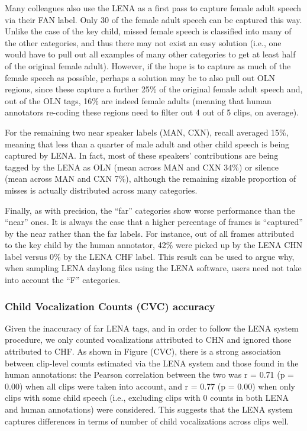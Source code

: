 \documentclass[english,floatsintext,man]{apa6}
\begin{document}
Many colleagues also use the LENA as a first pass to capture female
adult speech via their FAN label. Only 30 of the female adult speech can
be captured this way. Unlike the case of the key child, missed female
speech is classified into many of the other categories, and thus there
may not exist an easy solution (i.e., one would have to pull out all
examples of many other categories to get at least half of the original
female adult). However, if the hope is to capture as much of the female
speech as possible, perhaps a solution may be to also pull out OLN
regions, since these capture a further 25\% of the original female adult
speech and, out of the OLN tags, 16\% are indeed female adults (meaning
that human annotators re-coding these regions need to filter out 4 out
of 5 clips, on average).

For the remaining two near speaker labels (MAN, CXN), recall averaged
15\%, meaning that less than a quarter of male adult and other child
speech is being captured by LENA. In fact, most of these speakers'
contributions are being tagged by the LENA as OLN (mean across MAN and
CXN 34\%) or silence (mean across MAN and CXN 7\%), although the
remaining sizable proportion of misses is actually distributed across
many categories.

Finally, as with precision, the \enquote{far} categories show worse
performance than the \enquote{near} ones. It is always the case that a
higher percentage of frames is \enquote{captured} by the near rather
than the far labels. For instance, out of all frames attributed to the
key child by the human annotator, 42\% were picked up by the LENA CHN
label versus 0\% by the LENA CHF label. This result can be used to argue
why, when sampling LENA daylong files using the LENA software, users
need not take into account the \enquote{F} categories.

\subsubsection{Child Vocalization Counts (CVC)
accuracy}\label{child-vocalization-counts-cvc-accuracy}

Given the inaccuracy of far LENA tags, and in order to follow the LENA
system procedure, we only counted vocalizations attributed to CHN and
ignored those attributed to CHF. As shown in Figure (CVC), there is a
strong association between clip-level counts estimated via the LENA
system and those found in the human annotations: the Pearson correlation
between the two was r = 0.71 (p = 0.00) when all clips were taken into
account, and r = 0.77 (p = 0.00) when only clips with some child speech
(i.e., excluding clips with 0 counts in both LENA and human annotations)
were considered. This suggests that the LENA system captures differences
in terms of number of child vocalizations across clips well.
\end{document}
